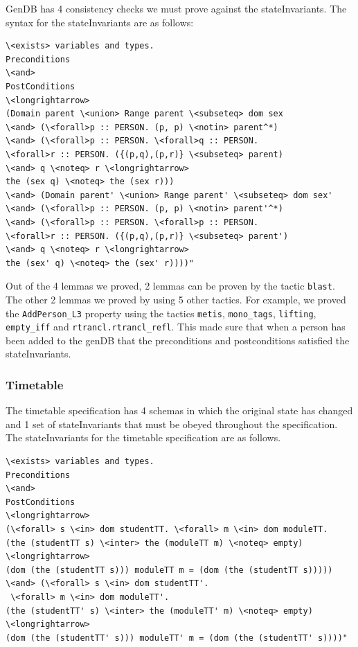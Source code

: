 GenDB \cite{mathlangexamples} has 4 consistency checks we must prove against the stateInvariants. The
syntax for the stateInvariants are as follows:

\begin{verbatim}
\<exists> variables and types.
Preconditions
\<and>
PostConditions
\<longrightarrow>
(Domain parent \<union> Range parent \<subseteq> dom sex
\<and> (\<forall>p :: PERSON. (p, p) \<notin> parent^*)
\<and> (\<forall>p :: PERSON. \<forall>q :: PERSON.
\<forall>r :: PERSON. ({(p,q),(p,r)} \<subseteq> parent)
\<and> q \<noteq> r \<longrightarrow>
the (sex q) \<noteq> the (sex r)))
\<and> (Domain parent' \<union> Range parent' \<subseteq> dom sex'
\<and> (\<forall>p :: PERSON. (p, p) \<notin> parent'^*)
\<and> (\<forall>p :: PERSON. \<forall>p :: PERSON.
\<forall>r :: PERSON. ({(p,q),(p,r)} \<subseteq> parent')
\<and> q \<noteq> r \<longrightarrow>
the (sex' q) \<noteq> the (sex' r))))"
\end{verbatim}

Out of the 4 lemmas we proved, 2 lemmas can be proven by the tactic \verb|blast|.
The other 2 lemmas we proved by using 5 other tactics. For example, we proved the
\verb|AddPerson_L3| property using the tactics \verb|metis|, \verb|mono_tags|,
\verb|lifting|, \verb|empty_iff| and \verb|rtrancl.rtrancl_refl|. This made sure
that when a person has been added to the genDB that the preconditions and
postconditions satisfied the stateInvariants.

\subsubsection{Timetable}

The timetable specification \cite{mathlangexamples} has 4 schemas in which the original state has
changed and 1 set of stateInvariants that must be obeyed throughout the
specification. The stateInvariants for the timetable specification are as
follows.

\begin{verbatim}
\<exists> variables and types.
Preconditions
\<and>
PostConditions
\<longrightarrow>
(\<forall> s \<in> dom studentTT. \<forall> m \<in> dom moduleTT.
(the (studentTT s) \<inter> the (moduleTT m) \<noteq> empty)
\<longrightarrow>
(dom (the (studentTT s))) moduleTT m = (dom (the (studentTT s)))))
\<and> (\<forall> s \<in> dom studentTT'.
 \<forall> m \<in> dom moduleTT'.
(the (studentTT' s) \<inter> the (moduleTT' m) \<noteq> empty)
\<longrightarrow>
(dom (the (studentTT' s))) moduleTT' m = (dom (the (studentTT' s))))"
\end{verbatim}

